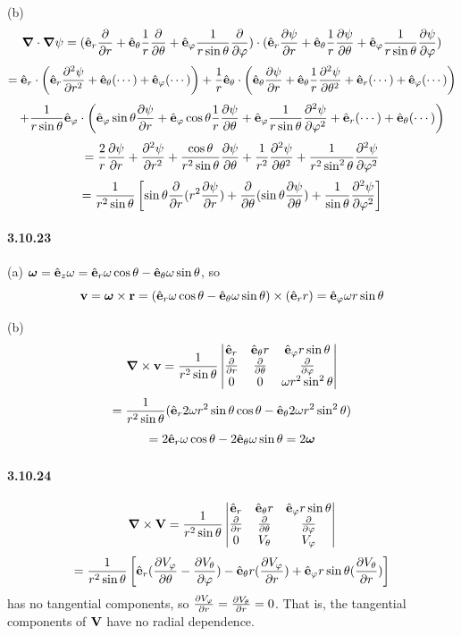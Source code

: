 \documentclass[a4paper]{article}
\begin{document}
(b)
\[
\del\cdot\del\psi=(\VE_r\pdv{}{r}+\VE_\theta\frac{1}{r}\pdv{}{\theta}+\VE_\varphi\frac{1}{r\sin\theta}\pdv{}{\varphi})\cdot(\VE_r\pdv{\psi}{r}+\VE_\theta\frac{1}{r}\pdv{\psi}{\theta}+\VE_\varphi\frac{1}{r\sin\theta}\pdv{\psi}{\varphi})
\]
\[
=\VE_r\cdot\left(\VE_r\pdv{^2\psi}{r^2}+\VE_\theta(\cdots)+\VE_\varphi(\cdots) \right)
+\frac{1}{r}\VE_\theta\cdot\left(\VE_\theta\pdv{\psi}{r}+\VE_\theta\frac{1}{r}\pdv{^2\psi}{\theta^2}+\VE_r(\cdots)+\VE_\varphi(\cdots) \right)
\]
\[
+\frac{1}{r\sin\theta}\VE_\varphi\cdot\left(\VE_\varphi\sin\theta\pdv{\psi}{r}+\VE_\varphi\cos\theta\frac{1}{r}\pdv{\psi}{\theta}+\VE_\varphi\frac{1}{r\sin\theta}\pdv{^2\psi}{\varphi^2}+\VE_r(\cdots)+\VE_\theta(\cdots) \right)
\]
\[
=\frac{2}{r}\pdv{\psi}{r}+\pdv{^2\psi}{r^2}+\frac{\cos\theta}{r^2\sin\theta}\pdv{\psi}{\theta}+\frac{1}{r^2}\pdv{^2\psi}{\theta^2}+\frac{1}{r^2\sin^2\theta}\pdv{^2\psi}{\varphi^2}
\]
\[
=\frac{1}{r^2\sin\theta}\left[\sin\theta\pdv{}{r}(r^2\pdv{\psi}{r})+\pdv{}{\theta}(\sin\theta\pdv{\psi}{\theta})+\frac{1}{\sin\theta}\pdv{^2\psi}{\varphi^2} \right]
\]

\paragraph{3.10.23}
(a) $\boldsymbol{\omega}=\VE_z\omega=\VE_r\omega\cos\theta-\VE_\theta\omega\sin\theta$, so
\[
\V{v}=\boldsymbol{\omega}\times\V{r}=(\VE_r\omega\cos\theta-\VE_\theta\omega\sin\theta)\times(\VE_r r)=\VE_\varphi\omega r \sin\theta
\]

(b)
\[
\del\times\V{v}=\frac{1}{r^2\sin\theta}
\begin{vmatrix}
\VE_r&\VE_\theta r&\VE_\varphi r\sin\theta\\
\pdv{}{r}&\pdv{}{\theta}&\pdv{}{\varphi}\\
0&0&\omega r^2\sin^2\theta
\end{vmatrix}\]
\[=\frac{1}{r^2\sin\theta}(\VE_r2\omega r^2\sin\theta\cos\theta-\VE_\theta2\omega r^2\sin^2\theta)\]
\[=2\VE_r\omega\cos\theta-2\VE_\theta\omega\sin\theta=2\boldsymbol{\omega}
\]

\paragraph{3.10.24}
\[
\del\times\V{V}=\frac{1}{r^2\sin\theta}
\begin{vmatrix}
\VE_r&\VE_\theta r&\VE_\varphi r\sin\theta\\
\pdv{}{r}&\pdv{}{\theta}&\pdv{}{\varphi}\\
0&V_\theta&V_\varphi
\end{vmatrix}
\]
\[
=\frac{1}{r^2\sin\theta}\left[\VE_r(\pdv{V_\varphi}{\theta}-\pdv{V_\theta}{\varphi})-\VE_\theta r(\pdv{V_\varphi}{r})+\VE_\varphi r\sin\theta(\pdv{V_\theta}{r}) \right]
\]
has no tangential components, so $\pdv{V_\varphi}{r}=\pdv{V_\theta}{r}=0$. That is, the tangential components of $\V{V}$ have no radial dependence.
\end{document}
